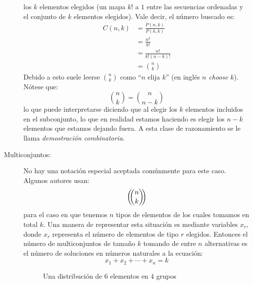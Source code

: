 \begin{description}
    los \(k\) elementos elegidos
    (un mapa \(k!\) a \(1\)
     entre las secuencias ordenadas
     y el conjunto de \(k\) elementos elegidos).
    Vale decir,
    el número buscado es:
    \begin{align}
      C(n, k)
	&= \frac{P(n, k)}{P(k, k)} \label{eq:Comb=Perm/Perm} \\
	&= \frac{n^{\underline{k}}}{k!} \label{eq:Comb=ff/f} \\
	&= \frac{n!}{k! (n - k)!} \label{eq:Comb=f/f*f} \\
	&= \binom{n}{k} \label{eq:Comb=binomial}
    \end{align}
    Debido a esto suele leerse \(\binom{n}{k}\)
    como ``\(n\) elija \(k\)''%
    (en inglés
      \emph{\(n\) \foreignlanguage{english}{choose} \(k\)}).
    Nótese que:
    \begin{equation*}
      \binom{n}{k} = \binom{n}{n - k}
    \end{equation*}
    lo que puede interpretarse
    diciendo que al elegir
    los \(k\) elementos incluidos en el subconjunto,
    lo que en realidad estamos haciendo
    es elegir los \(n - k\) elementos
    que estamos dejando fuera.
    A esta clase de razonamiento
    se le llama \emph{demostración combinatoria}.%
  \item[Multiconjuntos:]
    No hay una notación especial aceptada comúnmente para este caso.
    Algunos autores usan:
    \begin{equation*}
      \left( \!\! \binom{n}{k} \!\! \right)
    \end{equation*}
    para el caso en que tenemos \(n\) tipos de elementos
    de los cuales tomamos en total \(k\).
    Una manera de representar esta situación
    es mediante variables \(x_r\),
    donde \(x_r\) representa el número de elementos
    de tipo \(r\) elegidos.
    Entonces el número de multiconjuntos de tamaño \(k\)
    tomando de entre \(n\) alternativas
    es el número de soluciones en números naturales
    a la ecuación:
    \begin{equation*}
      x_1 + x_2 + \dotsb + x_n = k
    \end{equation*}
    \begin{figure}[ht]
      \centering
      \caption{Una distribución de \(6\) elementos en \(4\) grupos}
      \label{fig:stars-bars}
    \end{figure}

\end{description}
